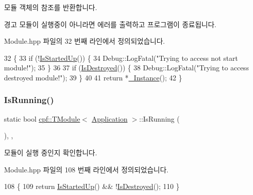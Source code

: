 모듈 객체의 참조를 반환합니다. \begin{DoxyWarning}{경고}
모듈이 실행중이 아니라면 에러를 출력하고 프로그램이 종료됩니다. 
\end{DoxyWarning}


Module.\+hpp 파일의 32 번째 라인에서 정의되었습니다.


\begin{DoxyCode}
32                              \{
33             \textcolor{keywordflow}{if} (!\hyperlink{classcpf_1_1_t_module_a73732afee7131dad652bf3e00c75cef9}{IsStartedUp}()) \{
34                 Debug::LogFatal(\textcolor{stringliteral}{"Trying to access not start module!"});
35             \}
36 
37             \textcolor{keywordflow}{if} (\hyperlink{classcpf_1_1_t_module_a9f70f0a70ac59b13b7a874f82c877337}{IsDestroyed}()) \{
38                 Debug::LogFatal(\textcolor{stringliteral}{"Trying to access destroyed module!"});
39             \}
40 
41             \textcolor{keywordflow}{return} *\hyperlink{classcpf_1_1_t_module_a06ab8af8ea6b294959937fd2bbc1e615}{\_Instance}();
42         \}
\end{DoxyCode}
\mbox{\label{classcpf_1_1_t_module_acd38943803d522ba6dcf7f0871b2f502}} 
\subsubsection{\texorpdfstring{Is\+Running()}{IsRunning()}}
{\footnotesize\ttfamily static bool \hyperlink{classcpf_1_1_t_module}{cpf\+::\+T\+Module}$<$ \hyperlink{classcpf_1_1_application}{Application}  $>$\+::Is\+Running (\begin{DoxyParamCaption}{ }\end{DoxyParamCaption})\hspace{0.3cm}{\ttfamily [inline]}, {\ttfamily [static]}, {\ttfamily [inherited]}}

모듈이 실행 중인지 확인합니다. 

Module.\+hpp 파일의 108 번째 라인에서 정의되었습니다.


\begin{DoxyCode}
108                                 \{
109             \textcolor{keywordflow}{return} \hyperlink{classcpf_1_1_t_module_a73732afee7131dad652bf3e00c75cef9}{IsStartedUp}() && !\hyperlink{classcpf_1_1_t_module_a9f70f0a70ac59b13b7a874f82c877337}{IsDestroyed}();
110         \}
\end{DoxyCode}
\mbox{\label{classcpf_1_1_application_afa25d5eb462d3d5b1ce19c6d217fe9e7}} 
